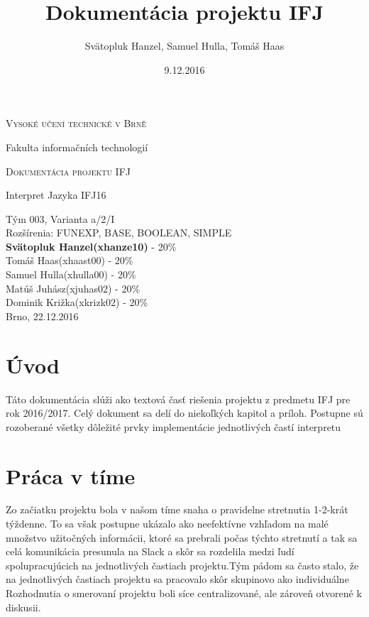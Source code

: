 \documentclass[12pt, a4paper]{article}
\title{Dokumentácia projektu IFJ}
\author{Svätopluk Hanzel, Samuel Hulla, Tomáš Haas}
\date{9.12.2016}
\begin{document}
    \begin{titlepage}
        \begin{center}
        {\scshape\LARGE Vysoké učení technické v Brně \par}
        {\Large Fakulta informačních technologií\par}
        \vspace{3cm}
        {\scshape\LARGE Dokumentácia projektu IFJ\par}
        {\Large Interpret Jazyka IFJ16 \par}
        \vspace{2cm}
        {\Large Tým 003, Varianta a/2/I}\\
        Rozšírenia: FUNEXP, BASE, BOOLEAN, SIMPLE\\
        \vfill
        \textbf{Svätopluk Hanzel(xhanze10)} - 20\% \\
        Tomáš Haas(xhaast00) - 20\% \\
        Samuel Hulla(xhulla00) - 20\% \\
        Matúš Juhász(xjuhas02) - 20\% \\
        Dominik Križka(xkrizk02) - 20\% \\
        \vspace{1cm}
        {\hfill Brno, 22.12.2016}
        \end{center}
    \end{titlepage}

    \tableofcontents{}
    \newpage
    \setcounter{page}{1}
    \section{Úvod}
    Táto dokumentácia slúži ako textová časť riešenia projektu z predmetu IFJ pre rok 2016/2017. Celý dokument sa delí do niekoľkých kapitol a príloh. Postupne sú rozoberané všetky dôležité prvky implementácie jednotlivých častí interpretu
    \newpage
    \section{Práca v tíme}
     Zo začiatku projektu bola v našom tíme snaha o pravidelne stretnutia 1-2-krát týždenne. To sa však postupne ukázalo ako neefektívne vzhľadom na malé množstvo užitočných informácii, ktoré sa prebrali počas týchto stretnutí a tak sa celá komunikácia presunula na Slack a skôr sa rozdelila medzi ľudí spolupracujúcich na jednotlivých častiach projektu.Tým pádom sa často stalo, že na jednotlivých častiach projektu sa pracovalo skôr skupinovo ako individuálne \\
	 Rozhodnutia o smerovaní projektu boli síce centralizované, ale zároveň otvorené k diskusii.
\end{document}
